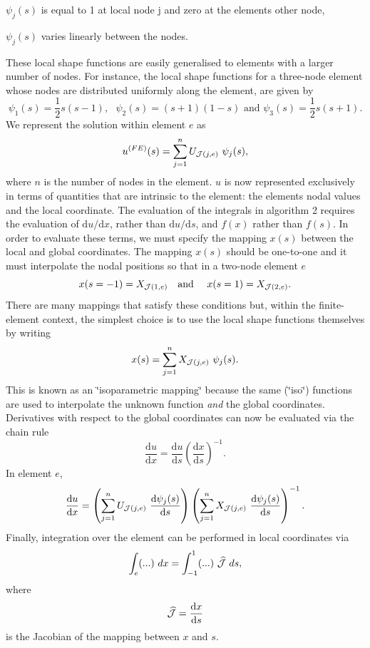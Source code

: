 \begin{DoxyItemize}
\item $ \psi_j(s) $ is equal to 1 at local node j and zero at the element\textquotesingle{}s other node,
\item $ \psi_j(s) $ varies linearly between the nodes.
\end{DoxyItemize}These local shape functions are easily generalised to elements with a larger number of nodes. For instance, the local shape functions for a three-\/node element whose nodes are distributed uniformly along the element, are given by \[ \psi_1(s) = \frac{1}{2} s (s-1), \ \ \ \psi_2(s) = (s+1)(1-s) \mbox{\ \ \ and \ \ \ } \psi_3(s) = \frac{1}{2} s (s+1). \] We represent the solution within element $ e $ as \[ u^{(FE)}(s) = \sum_{j=1}^n U_{{\cal J}(j,e)} \ \psi_j(s), \] where $n$ is the number of nodes in the element. $ u $ is now represented exclusively in terms of quantities that are intrinsic to the element\+: the element\textquotesingle{}s nodal values and the local coordinate. The evaluation of the integrals in algorithm 2 requires the evaluation of $ {\mbox{d} u}/{\mbox{d} x}$, rather than $ {\mbox{d} u}/{\mbox{d} s}$, and $f(x)$ rather than $f(s).$ In order to evaluate these terms, we must specify the mapping $ x(s) $ between the local and global coordinates. The mapping $ x(s) $ should be one-\/to-\/one and it must interpolate the nodal positions so that in a two-\/node element $e$ \[ x(s=-1) = X_{{\cal J}(1,e)} \mbox{\ \ \ and \ \ \ } x(s=1) = X_{{\cal J}(2,e)}.\] There are many mappings that satisfy these conditions but, within the finite-\/element context, the simplest choice is to use the local shape functions themselves by writing \[ x(s) = \sum_{j=1}^n X_{{\cal J}(j,e)} \ \psi_j(s). \] This is known as an \char`\"{}isoparametric mapping\char`\"{} because the same (\char`\"{}iso\char`\"{}) functions are used to interpolate the unknown function {\itshape and} the global coordinates. Derivatives with respect to the global coordinates can now be evaluated via the chain rule \[ \frac{\mbox{d} u}{\mbox{d} x} = \frac{\mbox{d} u}{\mbox{d} s} \left(\frac{\mbox{d} x}{\mbox{d} s}\right)^{-1}. \] In element $ e $, \[ \frac{\mbox{d} u}{\mbox{d} x} = \left(\sum_{j=1}^n U_{{\cal J}(j,e)} \ \frac{\mbox{d} \psi_j(s)}{\mbox{d} s} \right) \left(\sum_{j=1}^n X_{{\cal J}(j,e)} \ \frac{\mbox{d} \psi_j(s)}{\mbox{d} s} \right)^{-1}. \] Finally, integration over the element can be performed in local coordinates via \[ \int_e (...) \ dx = \int_{-1}^1 (...)\ \widehat{\cal J} \ ds, \] where \[ \widehat{\cal J} = \frac{\mbox{d} x}{\mbox{d} s} \] is the Jacobian of the mapping between $x$ and $ s. $

